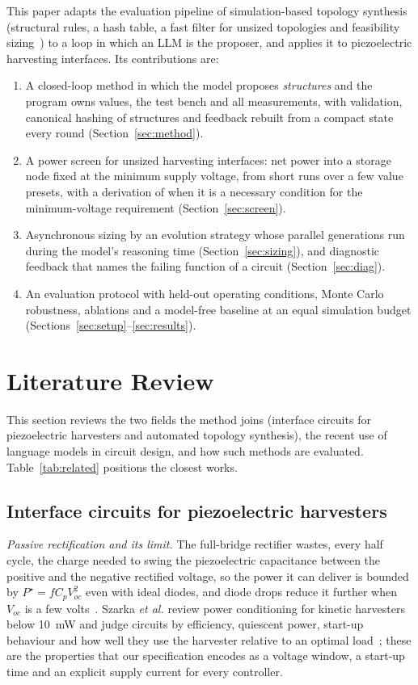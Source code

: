 \documentclass[journal]{IEEEtran}
\begin{document}
This paper adapts the evaluation pipeline of simulation-based topology synthesis (structural rules, a
hash table, a fast filter for unsized topologies and feasibility sizing~\cite{zhao2022drl}) to a loop in
which an LLM is the proposer, and applies it to piezoelectric harvesting interfaces. Its contributions
are:
\begin{enumerate}
\item A closed-loop method in which the model proposes \emph{structures} and the program owns values,
the test bench and all measurements, with validation, canonical hashing of structures and feedback
rebuilt from a compact state every round (Section~\ref{sec:method}).
\item A power screen for unsized harvesting interfaces: net power into a storage node fixed at the
minimum supply voltage, from short runs over a few value presets, with a derivation of when it is a
necessary condition for the minimum-voltage requirement (Section~\ref{sec:screen}).
\item Asynchronous sizing by an evolution strategy whose parallel generations run during the model's
reasoning time (Section~\ref{sec:sizing}), and diagnostic feedback that names the failing function of a
circuit (Section~\ref{sec:diag}).
\item An evaluation protocol with held-out operating conditions, Monte Carlo robustness, ablations and a
model-free baseline at an equal simulation budget (Sections~\ref{sec:setup}--\ref{sec:results}).
\end{enumerate}

\section{Literature Review}\label{sec:lit}
This section reviews the two fields the method joins (interface circuits for piezoelectric harvesters and
automated topology synthesis), the recent use of language models in circuit design, and how such methods
are evaluated. Table~\ref{tab:related} positions the closest works.

\subsection{Interface circuits for piezoelectric harvesters}
\emph{Passive rectification and its limit.} The full-bridge rectifier wastes, every half cycle, the charge
needed to swing the piezoelectric capacitance between the positive and the negative rectified voltage, so
the power it can deliver is bounded by $P^\star = f C_p V_{oc}^2$ even with ideal diodes, and diode drops
reduce it further when $V_{oc}$ is a few volts~\cite{lefeuvre2006comparison}. Szarka \emph{et al.} review
power conditioning for kinetic harvesters below \SI{10}{mW} and judge circuits by efficiency, quiescent
power, start-up behaviour and how well they use the harvester relative to an optimal load~\cite{szarka2012review};
these are the properties that our specification encodes as a voltage window, a start-up time and an
explicit supply current for every controller.
\end{document}
